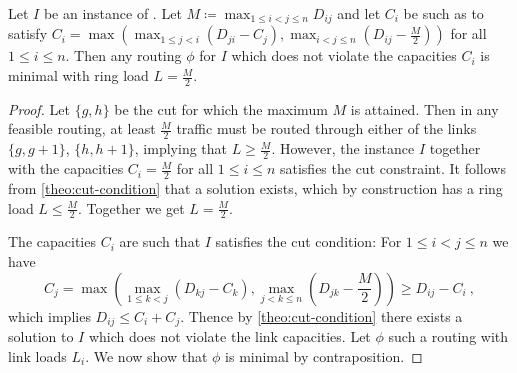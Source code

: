 \begin{lemma}
	\label{lemma:minimal-solution}
	Let $I$ be an instance of \RRL.
	Let $M \coloneqq \max_{1 \leq i < j \leq n} D_{ij}$ and let $C_i$ be such as to satisfy $C_i = \max \left(\max_{1 \leq j < i}(D_{ji} - C_j), \max_{i < j \leq n}(D_{ij} - \frac{M}{2})\right)$ for all $1 \leq i \leq n$.
	Then any routing $\phi$ for $I$ which does not violate the capacities $C_i$ is minimal with ring load $L = \frac{M}{2}$.
\end{lemma}
\begin{proof}
	Let $\{g, h\}$ be the cut for which the maximum $M$ is attained.
	Then in any feasible routing, at least $\frac{M}{2}$ traffic must be routed through either of the links $\{g, g+1\}$, $\{h, h+1\}$, implying that $L \geq \frac{M}{2}$.
	However, the instance $I$ together with the capacities $C_i = \frac{M}{2}$ for all $1 \leq i \leq n$ satisfies the cut constraint.
	It follows from \cref{theo:cut-condition} that a solution exists, which by construction has a ring load $L \leq \frac{M}{2}$.
	Together we get $L = \frac{M}{2}$.
	
	The capacities $C_i$ are such that $I$ satisfies the cut condition:
	For $1 \leq i < j \leq n$ we have
	\begin{equation}
		C_j = \max \left(\max_{1 \leq k < j}(D_{kj} - C_k), \max_{j < k \leq n}(D_{jk} - \frac{M}{2})\right) \geq D_{ij} - C_i \ ,
	\end{equation}
	which implies $D_{ij} \leq C_i + C_j$.
	Thence by \cref{theo:cut-condition} there exists a solution to $I$ which does not violate the link capacities.
	Let $\phi$ such a routing with link loads $L_i$.
	We now show that $\phi$ is minimal by contraposition.
	

\end{proof}

